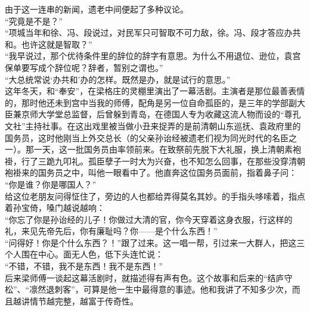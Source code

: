 由于这一连串的新闻，遗老中间便起了多种议论。\\

“究竟是不是？”\\

“项城当年和徐、冯、段说过，对民军只可智取不可力敌，徐。冯、段才答应办共和。也许这就是智取？”\\

“我早说过，那个优待条件里的辞位的辞字有意思。为什么不用退位、逊位，袁宫保单要写成个辞位呢？辞者，暂别之谓也。”\\

“大总统常说‘办共和’办的怎样。既然是办，就是试行的意思。”\\

这年冬天，和“奉安”，在梁格庄的灵棚里演出了一幕活剧。主演者是那位最善表情的，那时他还未到宫中当我的师傅，配角是另一位自命孤臣的，是三年的学部副大臣兼京师大学堂总监督，后曾躲到青岛，在德国人专为收藏这流人物而设的“尊孔文社”主持社事。在这出戏里被当做小丑来捉弄的是前清朝山东巡抚、袁政府里的国务员，这时他刚当上外交总长（的父亲孙诒经被遗老们视为同光时代的名臣之一）。那一天，这一批国务员由率领前来。在致祭前先脱下大礼服，换上清朝素袍褂，行了三跪九叩礼。孤臣孽子一时大为兴奋，也不知怎么回事，在那些没穿清朝袍褂来的国务员之中，叫他一眼看中了。他直奔这位国务员面前，指着鼻子问：\\

“你是谁？你是哪国人？”\\

给这位老朋友问得怔住了，旁边的人也都给弄得莫名其妙。的手指头哆嗦着，指点着孙宝倚，嗓门越说越响：\\

“你忘了你是孙诒经的儿子！你做过大清的官，你今天穿着这身衣服，行这样的礼，来见先帝先后，你有廉耻吗？你——是个什么东西！”\\

“问得好！你是个什么东西？！”跟了过来。这一唱一帮，引过来一大群人，把这三个人围在中心。面无人色，低下头连忙说：\\

“不错，不错，我不是东西！我不是东西！”\\

后来梁师傅一谈起这幕活剧时，就描述得有声有色。这个故事和后来的“结庐守松”、“凛然退刺客”，可算是他一生中最得意的事迹。他和我讲了不知多少次，而且越讲情节越完整，越富于传奇性。\\

